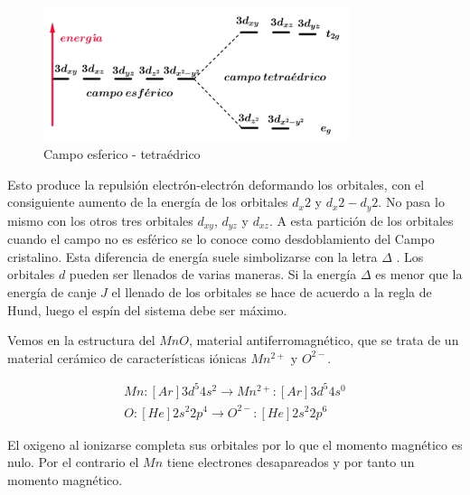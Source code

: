 \begin{figure}[H]
    \centering
    \includegraphics[width=0.8\textwidth]{./Figures/campoEsferico2}
	\caption{Campo esferico - tetraédrico}
	\label{fig:campoEsferico2}
\end{figure}

Esto produce la repulsión electrón-electrón deformando los orbitales, con el consiguiente aumento de la energía de los orbitales $d_{x}2$ y $d_{x}2-d_{y}2$. No pasa lo mismo con los otros tres orbitales $d_{xy}$, $d_{yz}$ y $d_{xz}$. A esta partición de los orbitales cuando el campo no es esférico se lo conoce como desdoblamiento del Campo cristalino. Esta diferencia de energía suele simbolizarse con la letra $\Delta$ . Los orbitales $d$ pueden ser llenados de varias maneras. Si la energía $\Delta$ es menor que la energía de canje $J$ el llenado de los orbitales se hace de acuerdo a la regla de Hund, luego el espín del sistema debe ser máximo.


Vemos en la estructura del $MnO$, material antiferromagnético, que se trata de un material cerámico de características iónicas $Mn^{2+}$ y $O^{2-}$.

\begin{equation}
\begin{aligned}
	Mn: [Ar]3d^{5}4s^{2}\rightarrow Mn^{2+}: [Ar]3d^{5}4s^{0}  \\
	O: [He]2s^{2}2p^{4}\rightarrow O^{2-}: [He]2s^{2}2p^{6}
\end{aligned}
\end{equation}

El oxigeno al ionizarse completa sus orbitales por lo que el momento magnético es nulo. Por el contrario el $Mn$ tiene electrones desapareados y por tanto un momento magnético.


